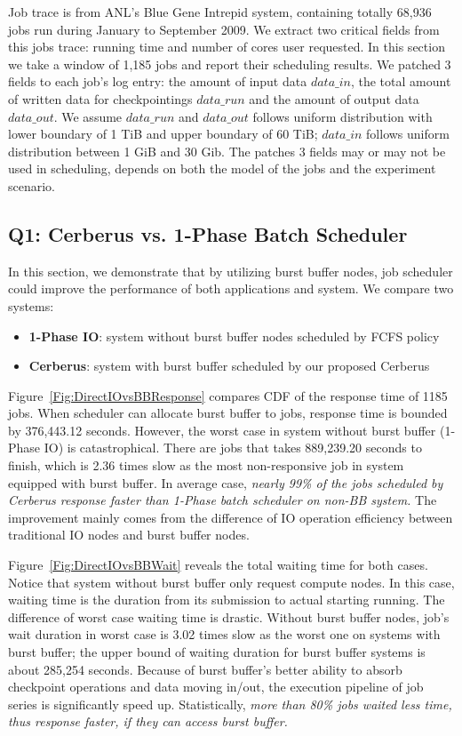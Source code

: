 Job trace is from ANL's Blue Gene Intrepid system,
containing totally 68,936 jobs run during January to September 2009\cite{JobTrace}.
We extract two critical fields from this jobs trace: running time and
number of cores user requested.
In this section we take a window of 1,185 jobs and report their scheduling results.
We patched 3 fields to each job's log entry: the amount of input data $data\_in$,
the total amount of written data for checkpointings $data\_run$
and the amount of output data $data\_out$.
We assume $data\_run$ and $data\_out$ follows uniform distribution with
lower boundary of 1 TiB and upper boundary of 60 TiB;
$data\_in$ follows uniform distribution between 1 GiB and 30 Gib.
The patches 3 fields may or may not be used in scheduling,
depends on both the model of the jobs and the experiment scenario.


\subsection{Q1: Cerberus vs. 1-Phase Batch Scheduler}
\label{Sec:Sim:DirectIOvsBB}
In this section, we demonstrate that by utilizing burst buffer nodes,
job scheduler could improve the performance of both applications and system.
We compare two systems:
\begin{itemize}
        \item \textbf{1-Phase IO}: system without burst buffer nodes
                scheduled by FCFS policy
        \item \textbf{Cerberus}: system with burst buffer 
                scheduled by our proposed Cerberus
\end{itemize}

Figure~\ref{Fig:DirectIOvsBBResponse} compares CDF of the response time of 1185 jobs.
When scheduler can allocate burst buffer to jobs,
response time is bounded by 376,443.12 seconds.
However, the worst case in system without burst buffer
(1-Phase IO) is catastrophical.
There are jobs that takes 889,239.20 seconds to finish,
which is 2.36 times slow as the most non-responsive job
in system equipped with burst buffer.
In average case, \textit{nearly 99\% of the jobs scheduled by Cerberus
response faster than 1-Phase batch scheduler on non-BB system.}
The improvement mainly comes from the difference of IO operation efficiency between
traditional IO nodes and burst buffer nodes.

Figure~\ref{Fig:DirectIOvsBBWait} reveals the total waiting time for both cases.
Notice that system without burst buffer only request compute nodes.
In this case, waiting time is the duration from its submission
to actual starting running.
The difference of worst case waiting time is drastic.
Without burst buffer nodes, job's wait duration in worst case is 3.02 times
slow as the worst one on systems with burst buffer;
the upper bound of waiting duration for burst buffer systems is about 285,254 seconds.
Because of burst buffer's better ability to
absorb checkpoint operations and data moving in/out,
the execution pipeline of job series is significantly speed up.
Statistically, \textit{more than 80\% jobs waited less time, thus response faster,
if they can access burst buffer.}


